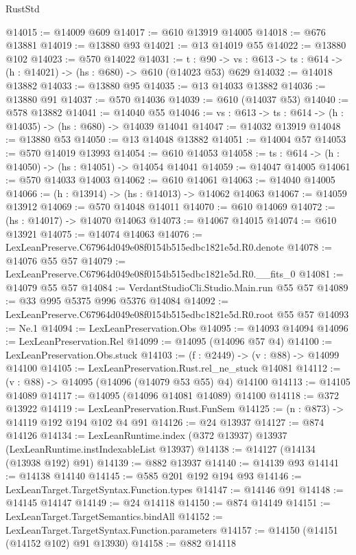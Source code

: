 \begin{lexlean}{RustStd}
\begin{coremodule}
@14015 := @14009 @609
@14017 := @610 @13919 @14005
@14018 := @676 @13881
@14019 := @13880 @93
@14021 := @13 @14019 @55
@14022 := @13880 @102
@14023 := @570 @14022
@14031 := {t : @90} ->
  {vs : @613} -> {ts : @614} -> (h : @14021) -> (hs : @680) -> @610 (@14023 @53) @629
@14032 := @14018 @13882
@14033 := @13880 @95
@14035 := @13 @14033 @13882
@14036 := @13880 @91
@14037 := @570 @14036
@14039 := @610 (@14037 @53)
@14040 := @578 @13882
@14041 := @14040 @55
@14046 := {vs : @613} -> {ts : @614} -> (h : @14035) -> (hs : @680) -> @14039 @14041
@14047 := @14032 @13919
@14048 := @13880 @53
@14050 := @13 @14048 @13882
@14051 := @14004 @57
@14053 := @570 @14019 @13993
@14054 := @610 @14053
@14058 := {ts : @614} -> (h : @14050) -> (hs : @14051) -> @14054 @14041
@14059 := @14047 @14005
@14061 := @570 @14033 @14003
@14062 := @610 @14061
@14063 := @14040 @14005
@14066 := (h : @13914) -> (hs : @14013) -> @14062 @14063
@14067 := @14059 @13912
@14069 := @570 @14048 @14011
@14070 := @610 @14069
@14072 := (hs : @14017) -> @14070 @14063
@14073 := @14067 @14015
@14074 := @610 @13921
@14075 := @14074 @14063
@14076 := LexLeanPreserve.C67964d049e08f0154b515edbc1821e5d.R0.denote
@14078 := @14076 @55 @57
@14079 := LexLeanPreserve.C67964d049e08f0154b515edbc1821e5d.R0.__fits_0
@14081 := @14079 @55 @57
@14084 := VerdantStudioCli.Studio.Main.run @55 @57
@14089 := @33 @995 @5375 @996 @5376 @14084
@14092 := LexLeanPreserve.C67964d049e08f0154b515edbc1821e5d.R0.root @55 @57
@14093 := Ne.{1}
@14094 := LexLeanPreservation.Obs
@14095 := @14093 @14094
@14096 := LexLeanPreservation.Rel
@14099 := @14095 (@14096 @57 @4)
@14100 := LexLeanPreservation.Obs.stuck
@14103 := (f : @2449) -> (v : @88) -> @14099 @14100
@14105 := LexLeanPreservation.Rust.rel_ne_stuck @14081
@14112 := (v : @88) -> @14095 (@14096 (@14079 @53 @55) @4) @14100
@14113 := @14105 @14089
@14117 := @14095 (@14096 @14081 @14089) @14100
@14118 := @372 @13922
@14119 := LexLeanPreservation.Rust.FunSem
@14125 := (n : @873) -> @14119 @192 @194 @102 @4 @91
@14126 := @24 @13937
@14127 := @874 @14126
@14134 := LexLeanRuntime.index (@372 @13937) @13937 (LexLeanRuntime.instIndexableList @13937)
@14138 := @14127 (@14134 (@13938 @192) @91)
@14139 := @882 @13937
@14140 := @14139 @93
@14141 := @14138 @14140
@14145 := @585 @201 @192 @194 @93
@14146 := LexLeanTarget.TargetSyntax.Function.types
@14147 := @14146 @91
@14148 := @14145 @14147
@14149 := @24 @14118
@14150 := @874 @14149
@14151 := LexLeanTarget.TargetSemantics.bindAll
@14152 := LexLeanTarget.TargetSyntax.Function.parameters
@14157 := @14150 (@14151 (@14152 @102) @91 @13930)
@14158 := @882 @14118

\end{coremodule}
\end{lexlean}
